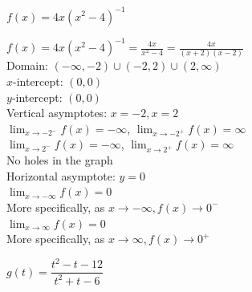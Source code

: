 \documentclass{ximera}
\begin{document}
\begin{question}
\begin{problem}
\begin{solution}
\begin{center} 
\end{center}
\end{solution}
\end{problem}  

\begin{problem}
$f(x) = 4x(x^2-4)^{-1}$

\begin{solution}
$f(x) =  4x(x^2-4)^{-1} =  \frac{4x}{x^{2} -4} = \frac{4x}{(x + 2)(x - 2)}$\\
Domain: $(-\infty, -2) \cup (-2, 2) \cup (2, \infty)$\\
$x$-intercept:  $(0,0)$\\
$y$-intercept:  $(0,0)$\\
Vertical asymptotes: $x = -2, x = 2$\\
$\lim_{x \rightarrow -2^{-}} f(x) = -\infty$, $\lim_{x \rightarrow -2^{+}} f(x) = \infty$ \\
$\lim_{x \rightarrow 2^{-}} f(x) = -\infty$, $\lim_{x \rightarrow 2^{+}} f(x) = \infty$ \\
No holes in the graph\\
Horizontal asymptote: $y = 0$ \\
$\lim_{x \rightarrow -\infty} f(x) = 0$\\
More specifically, as $x \rightarrow -\infty, f(x) \rightarrow 0^{-}$\\
$\lim_{x \rightarrow \infty} f(x) = 0$\\
More specifically, as $x \rightarrow \infty, f(x) \rightarrow 0^{+}$\\

\begin{center} 
\end{center}
\end{solution}
\end{problem}  

\begin{problem}
$g(t) = \dfrac{t^2-t-12}{t^2+t-6}$


\end{problem}
\end{question}
\end{document}
